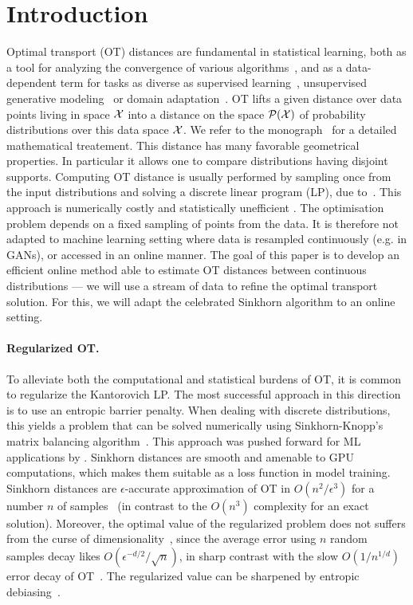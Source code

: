 \section{Introduction}

Optimal transport (OT) distances are fundamental in statistical learning, both as a tool for analyzing the convergence of various algorithms~\cite{canas2012learning,dalalyan2019user}, and as a data-dependent term for tasks as diverse as supervised learning~\cite{frogner2015learning}, unsupervised generative modeling~\cite{arjovsky2017wgan} or domain adaptation~\cite{courty2016optimal}.
%
OT lifts a given distance over data points living in space $\mathcal{X}$ into a distance
on the space $\mathcal{P}(\mathcal{X})$ of probability distributions over this data space $\mathcal{X}$. We refer to the monograph~\cite{santambrogio2015optimal} for a detailed mathematical treatement.
%
This distance has many favorable geometrical properties. In particular it allows one to compare distributions having disjoint supports. 
% 
Computing OT distance is usually performed by sampling once from the input
distributions and solving a discrete linear program (LP), due to~\citet{Kantorovich42}. This approach is numerically costly and
statistically unefficient \cite{weed2019sharp}. The optimisation problem depends
on a fixed sampling of points from the data. It is therefore not adapted to
machine learning setting where data is resampled continuously (e.g. in GANs), or
accessed in an online manner. The goal of this paper is to develop an efficient
online method able to estimate OT distances between continuous distributions ---
we will use a stream of data to refine the optimal transport solution. For this, we will
adapt the celebrated Sinkhorn algorithm to an online setting.
  


\paragraph{Regularized OT.}

To alleviate both the computational and statistical burdens of OT, it is common
to regularize the Kantorovich LP.
%
The most successful approach in this direction is to use an entropic barrier penalty. 
%
When dealing with discrete distributions, this yields a problem that can be solved
numerically using Sinkhorn-Knopp's matrix balancing
algorithm~\cite{Sinkhorn64,sinkhorn1967concerning}.
%
This approach was pushed forward for ML applications
by \citet{cuturi2013sinkhorn}. Sinkhorn distances are smooth and amenable to GPU computations, which makes them suitable as a loss function in model training.
%
Sinkhorn distances are $\epsilon$-accurate approximation of OT in
$O(n^2/\epsilon^3)$ for a number $n$ of samples~\cite{altschuler2017near} (in
contrast to the $O(n^3)$ complexity for an exact solution). Moreover, the optimal
value of the regularized problem does not suffers from the curse of
dimensionality~\cite{2019-Genevay-aistats}, since the average error using $n$
random samples decay likes $O(\epsilon^{-d/2}/\sqrt{n})$, in sharp contrast with
the slow $O(1/n^{1/d})$ error decay of OT~\cite{weed2019sharp}. The regularized
value can be sharpened by entropic debiasing~\cite{2019-Feydy-aistats}.  

